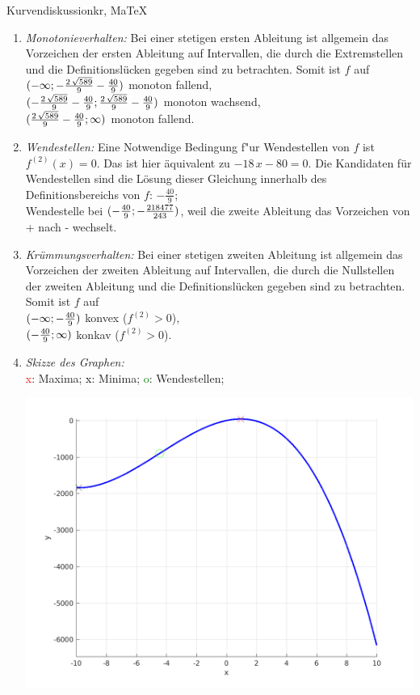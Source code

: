 \begin{MAufgabe}{Kurvendiskussion}{kr, MaTeX}
\begin{enumerate}
 \item \emph{Monotonieverhalten:} 
 Bei einer stetigen ersten Ableitung ist allgemein das Vorzeichen der ersten Ableitung auf Intervallen, die durch die Extremstellen und die Definitionsl\"ucken gegeben sind zu betrachten. Somit ist $f$ auf \\ 
 $(-\infty; - \frac{2\, \sqrt{589}}{9} - \frac{40}{9})$ monoton fallend, \\ 
 $( - \frac{2\, \sqrt{589}}{9} - \frac{40}{9};\frac{2\, \sqrt{589}}{9} - \frac{40}{9})$ monoton  wachsend, \\ 
 $(\frac{2\, \sqrt{589}}{9} - \frac{40}{9}; \infty)$ monoton fallend. \\ 
 \item \emph{Wendestellen:} 
 Eine Notwendige Bedingung f"ur Wendestellen von $f$ ist $f^{(2)}(x)=0$. 
 Das ist hier \"aquivalent zu $ - 18\, x - 80=0$. 
 Die Kandidaten f\"ur Wendestellen sind die L\"osung dieser Gleichung innerhalb des Definitionsbereichs von $f$: $- \frac{40}{9}$; \\ 
 Wendestelle bei $(- \frac{40}{9};- \frac{218477}{243})$, weil die zweite Ableitung das Vorzeichen von + nach - wechselt. \\ 
 \item \emph{Kr\"ummungsverhalten:} 
 Bei einer stetigen zweiten Ableitung ist allgemein das Vorzeichen der zweiten Ableitung auf Intervallen, die durch die Nullstellen der zweiten Ableitung und die Definitionsl\"ucken gegeben sind zu betrachten. 
 Somit ist $f$ auf \\ 
 $(-\infty ;- \frac{40}{9})$  konvex ($f^{(2)}>0$), \\ 
 $(- \frac{40}{9}; \infty)$  konkav ($f^{(2)}>0$). \\ 
 \item \emph{Skizze des Graphen:} \\ 
 {\textcolor{red} x}: Maxima; {\textcolor{black} x}: Minima; {\textcolor{green} o}: Wendestellen; 
  \begin{center}
  \includegraphics[width=0.8\linewidth]{Abb_zur_Ag_autogenerated_fractions_44.png} \end{center}
  
 \end{enumerate}
 \else\relax\fi
  \end{MAufgabe}